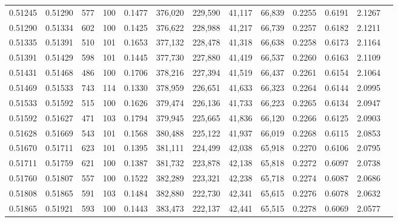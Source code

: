 \begin{tabular}{rrrrrrrrrrrrr}
0.51245 & 0.51290 &   577 & 100 &                                     0.1477 & 376,020 & 229,590 &  41,117 &  66,839 & 0.2255 & 0.6191 & 2.1267 \\
0.51290 & 0.51334 &   602 & 100 &                                     0.1425 & 376,622 & 228,988 &  41,217 &  66,739 & 0.2257 & 0.6182 & 2.1211 \\
0.51335 & 0.51391 &   510 & 101 &                                     0.1653 & 377,132 & 228,478 &  41,318 &  66,638 & 0.2258 & 0.6173 & 2.1164 \\
0.51391 & 0.51429 &   598 & 101 &                                     0.1445 & 377,730 & 227,880 &  41,419 &  66,537 & 0.2260 & 0.6163 & 2.1109 \\
0.51431 & 0.51468 &   486 & 100 &                                     0.1706 & 378,216 & 227,394 &  41,519 &  66,437 & 0.2261 & 0.6154 & 2.1064 \\
0.51469 & 0.51533 &   743 & 114 &                                     0.1330 & 378,959 & 226,651 &  41,633 &  66,323 & 0.2264 & 0.6144 & 2.0995 \\
0.51533 & 0.51592 &   515 & 100 &                                     0.1626 & 379,474 & 226,136 &  41,733 &  66,223 & 0.2265 & 0.6134 & 2.0947 \\
0.51592 & 0.51627 &   471 & 103 &                                     0.1794 & 379,945 & 225,665 &  41,836 &  66,120 & 0.2266 & 0.6125 & 2.0903 \\
0.51628 & 0.51669 &   543 & 101 &                                     0.1568 & 380,488 & 225,122 &  41,937 &  66,019 & 0.2268 & 0.6115 & 2.0853 \\
0.51670 & 0.51711 &   623 & 101 &                                     0.1395 & 381,111 & 224,499 &  42,038 &  65,918 & 0.2270 & 0.6106 & 2.0795 \\
0.51711 & 0.51759 &   621 & 100 &                                     0.1387 & 381,732 & 223,878 &  42,138 &  65,818 & 0.2272 & 0.6097 & 2.0738 \\
0.51760 & 0.51807 &   557 & 100 &                                     0.1522 & 382,289 & 223,321 &  42,238 &  65,718 & 0.2274 & 0.6087 & 2.0686 \\
0.51808 & 0.51865 &   591 & 103 &                                     0.1484 & 382,880 & 222,730 &  42,341 &  65,615 & 0.2276 & 0.6078 & 2.0632 \\
0.51865 & 0.51921 &   593 & 100 &                                     0.1443 & 383,473 & 222,137 &  42,441 &  65,515 & 0.2278 & 0.6069 & 2.0577 \\

\end{tabular}
